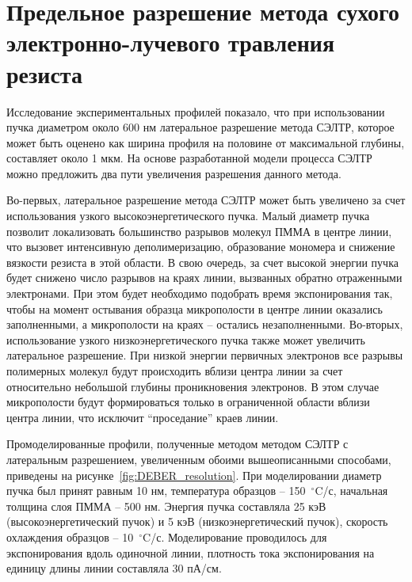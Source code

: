 \section{Предельное разрешение метода сухого электронно-лучевого травления резиста}

Исследование экспериментальных профилей показало, что при использовании пучка диаметром около 600 нм латеральное разрешение метода СЭЛТР, которое может быть оценено как ширина профиля на половине от максимальной глубины, составляет около 1 мкм. На основе разработанной модели процесса СЭЛТР можно предложить два пути увеличения разрешения данного метода.

Во-первых, латеральное разрешение метода СЭЛТР может быть увеличено за счет использования узкого высокоэнергетического пучка. Малый диаметр пучка позволит локализовать большинство разрывов молекул ПММА в центре линии, что вызовет интенсивную деполимеризацию, образование мономера и снижение вязкости резиста в этой области. В свою очередь, за счет высокой энергии пучка будет снижено число разрывов на краях линии, вызванных обратно отраженными электронами. При этом будет необходимо подобрать время экспонирования так, чтобы на момент остывания образца микрополости в центре линии оказались заполненными, а микрополости на краях -- остались незаполненными. Во-вторых, использование узкого низкоэнергетического пучка также может увеличить латеральное разрешение. При низкой энергии первичных электронов все разрывы полимерных молекул будут происходить вблизи центра линии за счет относительно небольшой глубины проникновения электронов. В этом случае микрополости будут формироваться только в ограниченной области вблизи центра линии, что исключит ``проседание'' краев линии.

Промоделированные профили, полученные методом методом СЭЛТР с латеральным разрешением, увеличенным обоими вышеописанными способами, приведены на рисунке~\ref{fig:DEBER_resolution}. При моделировании диаметр пучка был принят равным 10 нм, температура образцов -- 150~$^\circ$C/с, начальная толщина слоя ПММА -- 500 нм. Энергия пучка составляла 25 кэВ (высокоэнергетический пучок) и 5 кэВ (низкоэнергетический пучок), скорость охлаждения образцов -- 10~$^\circ$C/с. Моделирование проводилось для экспонирования вдоль одиночной линии, плотность тока экспонирования на единицу длины линии составляла 30 пА/см.

